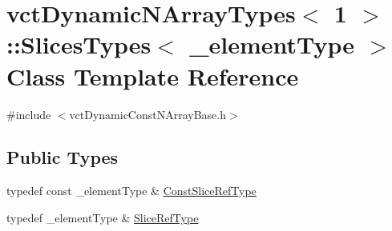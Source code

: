 \hypertarget{classvct_dynamic_n_array_types_3_011_01_4_1_1_slices_types}{}\section{vct\+Dynamic\+N\+Array\+Types$<$ 1 $>$\+:\+:Slices\+Types$<$ \+\_\+element\+Type $>$ Class Template Reference}
\label{classvct_dynamic_n_array_types_3_011_01_4_1_1_slices_types}


{\ttfamily \#include $<$vct\+Dynamic\+Const\+N\+Array\+Base.\+h$>$}

\subsection*{Public Types}
\begin{DoxyCompactItemize}
\item 
typedef const \+\_\+element\+Type \& \hyperlink{classvct_dynamic_n_array_types_3_011_01_4_1_1_slices_types_a18f8addeaaa816d30b9ed8a7e7dd8f77}{Const\+Slice\+Ref\+Type}
\item 
typedef \+\_\+element\+Type \& \hyperlink{classvct_dynamic_n_array_types_3_011_01_4_1_1_slices_types_a34c9917853ea79e85ef0924a9a56a60f}{Slice\+Ref\+Type}
\end{DoxyCompactItemize}
